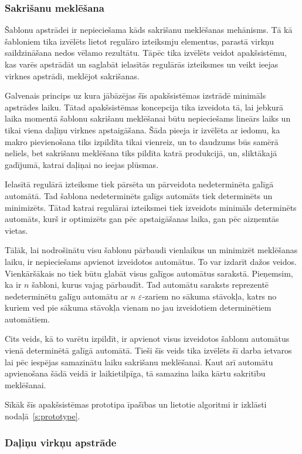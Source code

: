 \subsubsection{\label{sbsbs:sys_matches}Sakrišanu meklēšana}

Šablonu apstrādei ir nepieciešama kāds sakrišanu meklēšanas mehānisms. Tā kā šabloniem tika izvēlēts lietot regulāro izteiksmju elementus, parastā virkņu saildzināšana nedos vēlamo rezultātu. Tāpēc tika izvēlēts veidot apakšsistēmu, kas varēs apstrādāt un saglabāt ielasītās regulārās izteiksmes un veikt ieejas virknes apstrādi, meklējot sakrišanas.

Galvenais princips uz kura jābāzējas šīs apakšsistēmas izstrādē minimāls apstrādes laiku. Tātad apakšsistēmas koncepcija  tika izveidota tā, lai jebkurā laika momentā šablonu sakrišanu meklēšanai būtu nepieciešams lineārs laiks un tikai viena daļiņu virknes apstaigāšana. Šāda pieeja ir izvēlēta ar iedomu, ka makro pievienošana tiks izpildīta tikai vienreiz, un to daudzums būs samērā neliels, bet sakrišanu meklēšana tiks pildīta katrā produkcijā, un, sliktākajā gadījumā, katrai daļiņai no ieejas plūsmas.

Ielasītā regulārā izteiksme tiek pārsēta un pārveidota nedeterminēta galīgā automātā. Tad šablona nedeterminēts galīgs automāts tiek determinēts un minimizēts. Tātad katrai regulārai izteiksmei tiek izveidots minimāls determinēts automāts, kurš ir optimizēts gan pēc apstaigāšanas laika, gan pēc aizņemtās vietas.

Tālāk, lai nodrošinātu visu šablonu pārbaudi vienlaikus un minimizēt meklēšanas laiku, ir nepieciešams apvienot izveidotos automātus. To var izdarīt dažos veidos. Vienkāršākais no tiek būtu glabāt visus galīgos automātus sarakstā. Pieņemsim, ka ir $n$ šabloni, kurus vajag pārbaudīt. Tad automātu saraksts reprezentē nedeterminētu galīgu automātu ar $n$ $\varepsilon$-zariem no sākuma stāvokļa, katrs no kuriem ved pie sākuma stāvokļa vienam no jau izveidotiem determinētiem automātiem.

Cits veids, kā to varētu izpildīt, ir apvienot visus izveidotos šablonu automātus vienā determinētā galīgā automātā. Tieši šīs veids tika izvēlēts šī darba ietvaros lai pēc iespējas samazinātu laiku sakrišanu meklēšanai. Kaut arī automātu apvienošana šādā veidā ir laikietilpīga, tā samazina laika kārtu sakritību meklēšanai.

Sīkāk šīs apakšsistēmas prototipa īpašības un lietotie algoritmi ir izklāsti nodaļā~\ref{s:prototype}.

\subsubsection{\label{sbsbs:sys_language}Daļiņu virkņu apstrāde}

